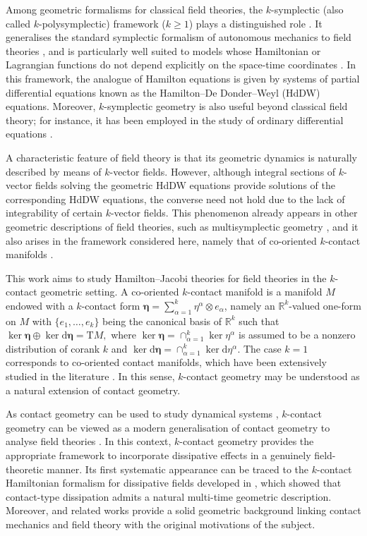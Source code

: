 \documentclass[11pt,twoside]{article}
\theoremstyle{plain}
\theoremstyle{definition}
\theoremstyle{remark}
\newcommand{\dd}{\mathrm{d}}
\renewcommand{\d}{\mathrm{d}}
\newcommand{\T}{\mathrm{T}}
\begin{document}
Among geometric formalisms for classical field theories, the $k$-symplectic (also called $k$-polysymplectic) framework ($k\geq 1$) plays a distinguished role \cite{Awa_92,Gun_87,LSV_15}. It generalises the standard symplectic formalism of autonomous mechanics to field theories \cite{Gun_87}, and is particularly well suited to models whose Hamiltonian or Lagrangian functions do not depend explicitly on the space-time coordinates \cite{Awa_92,Awa_94,AG_00}. In this framework, the analogue of Hamilton equations is given by systems of partial differential equations known as the Hamilton--De Donder--Weyl (HdDW) equations. Moreover, $k$-symplectic geometry is also useful beyond classical field theory; for instance, it has been employed in the study of ordinary differential equations \cite{LV_15,LS_20}.

A characteristic feature of field theory is that its geometric dynamics is naturally described by means of $k$-vector fields. However, although integral sections of $k$-vector fields solving the geometric HdDW equations provide solutions of the corresponding HdDW equations, the converse need not hold due to the lack of integrability of certain $k$-vector fields. This phenomenon already appears in other geometric descriptions of field theories, such as multisymplectic geometry \cite{EMR_99,ELSZ_21}, and it also arises in the framework considered here, namely that of co-oriented $k$-contact manifolds \cite{LRS_25,GGMRR_20,GGMRR_21,GRR_22,Riv_22}.

This work aims to study Hamilton--Jacobi theories for field theories in the $k$-contact geometric setting. 
A co-oriented $k$-contact manifold is a manifold $M$ endowed with a $k$-contact form $\bm\eta=\sum_{\alpha=1}^k\eta^\alpha\otimes e_\alpha$, namely an $\mathbb{R}^k$-valued one-form on $M$ with $\{e_1,\ldots,e_k\}$ being the canonical basis of $\mathbb{R}^k$ such that
\(
\ker \bm\eta\oplus \ker \d\bm\eta=\T M,
\)
where $\ker\bm\eta=\cap_{\alpha=1}^k\ker \eta^\alpha$ is assumed to be a nonzero distribution of corank $k$ and $ \ker\dd\bm\eta=\cap_{\alpha=1}^k\ker \dd \eta^\alpha$. The case $k=1$ corresponds to co-oriented contact manifolds, which have been extensively studied in the literature \cite{LGLRR_20,LL_20,LL_19,ELLM_21,GGMRR_20a,SMLL_21}. In this sense, $k$-contact geometry may be understood as a natural extension of contact geometry.

As contact geometry can be used to study dynamical systems \cite{BCT_17,KT_10,LL_19}, $k$-contact geometry can be viewed as a modern generalisation of contact geometry to analyse field theories \cite{LL_19,GGMRR_20,LLM_21}. In this context, $k$-contact geometry provides the appropriate framework to incorporate dissipative effects in a genuinely field-theoretic manner. Its first systematic appearance can be traced to the $k$-contact Hamiltonian formalism for dissipative fields developed in \cite{GGMRR_20}, which showed that contact-type dissipation admits a natural multi-time geometric description. Moreover, \cite{Riv_22}  and related works provide a solid geometric background linking contact mechanics and field theory with the original motivations of the subject. 
\end{document}
